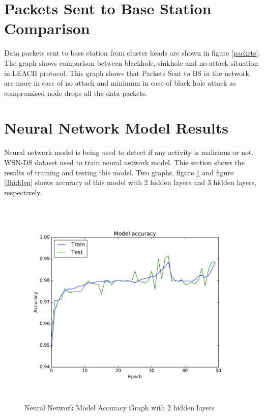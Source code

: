 \section{Packets Sent to Base Station Comparison}
Data packets sent to base station from cluster heads are shown in figure \ref{packets}. The graph shows comparison between blackhole, sinkhole and no attack situation in LEACH protocol. This graph shows that Packets Sent to BS in the network are more in case of no attack and minimum in case of black hole attack as compromised node drops all the data packets.

\section{Neural Network Model Results}
\label{NNresults}
Neural network model is being used to detect if any activity is malicious or not. WSN-DS dataset used to train neural network model. This section shows the results of training and testing this model. Two graphs, figure \ref{2hidden} and figure \ref{3hidden} shows accuracy of this model with 2 hidden layers and 3 hidden layers, respectively.
\begin{figure}[hbp]
    \centering
    \includegraphics[width=5.5in, height=4in] {Figures/PDF/2hidden.pdf}
    \caption{Neural Network Model Accuracy Graph with 2 hidden layers}
    \label{2hidden}
\end{figure}

